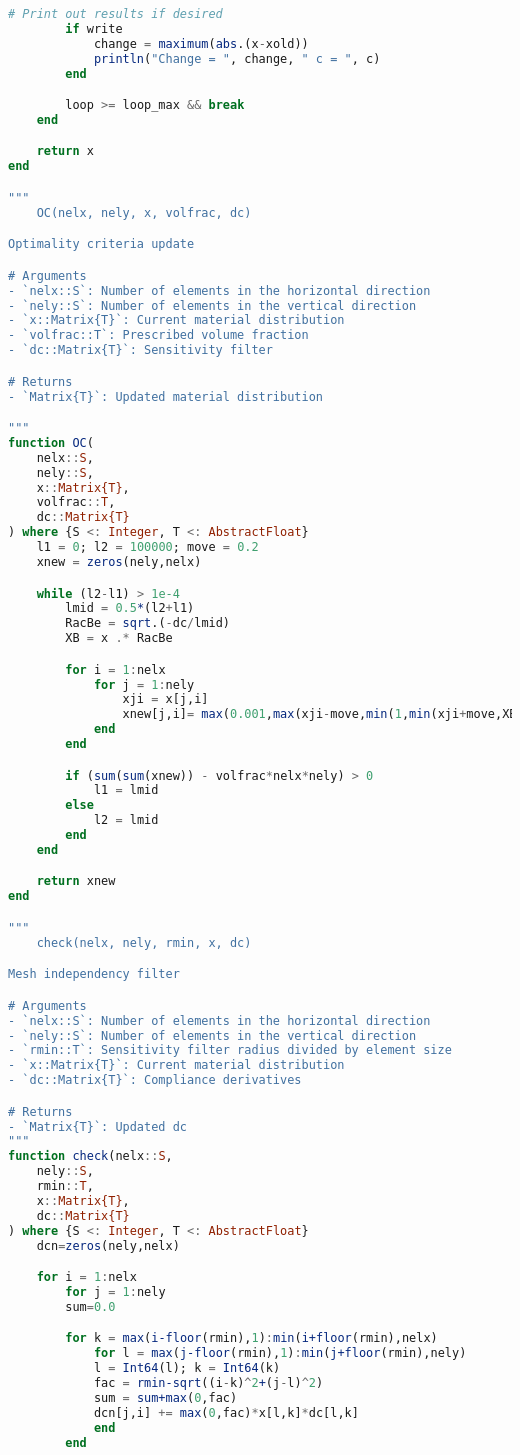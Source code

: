\begin{lstlisting}[language=Julia, title=\texttt{toph.jl}, label={lst:toph}]
        # Print out results if desired
        if write
            change = maximum(abs.(x-xold))
            println("Change = ", change, " c = ", c)
        end

        loop >= loop_max && break
    end

    return x
end

"""
    OC(nelx, nely, x, volfrac, dc)

Optimality criteria update

# Arguments
- `nelx::S`: Number of elements in the horizontal direction
- `nely::S`: Number of elements in the vertical direction
- `x::Matrix{T}`: Current material distribution
- `volfrac::T`: Prescribed volume fraction
- `dc::Matrix{T}`: Sensitivity filter

# Returns
- `Matrix{T}`: Updated material distribution

"""
function OC(
    nelx::S,
    nely::S,
    x::Matrix{T},
    volfrac::T,
    dc::Matrix{T}
) where {S <: Integer, T <: AbstractFloat}
    l1 = 0; l2 = 100000; move = 0.2
    xnew = zeros(nely,nelx)

    while (l2-l1) > 1e-4
        lmid = 0.5*(l2+l1)
        RacBe = sqrt.(-dc/lmid)
        XB = x .* RacBe

        for i = 1:nelx
            for j = 1:nely
                xji = x[j,i]
                xnew[j,i]= max(0.001,max(xji-move,min(1,min(xji+move,XB[j,i]))))
            end
        end

        if (sum(sum(xnew)) - volfrac*nelx*nely) > 0
            l1 = lmid
        else
            l2 = lmid
        end
    end

    return xnew
end

"""
    check(nelx, nely, rmin, x, dc)

Mesh independency filter

# Arguments
- `nelx::S`: Number of elements in the horizontal direction
- `nely::S`: Number of elements in the vertical direction
- `rmin::T`: Sensitivity filter radius divided by element size
- `x::Matrix{T}`: Current material distribution
- `dc::Matrix{T}`: Compliance derivatives

# Returns
- `Matrix{T}`: Updated dc
"""
function check(nelx::S,
    nely::S,
    rmin::T,
    x::Matrix{T},
    dc::Matrix{T}
) where {S <: Integer, T <: AbstractFloat}
    dcn=zeros(nely,nelx)

    for i = 1:nelx
        for j = 1:nely
        sum=0.0

        for k = max(i-floor(rmin),1):min(i+floor(rmin),nelx)
            for l = max(j-floor(rmin),1):min(j+floor(rmin),nely)
            l = Int64(l); k = Int64(k)
            fac = rmin-sqrt((i-k)^2+(j-l)^2)
            sum = sum+max(0,fac)
            dcn[j,i] += max(0,fac)*x[l,k]*dc[l,k]
            end
        end


\end{lstlisting}
